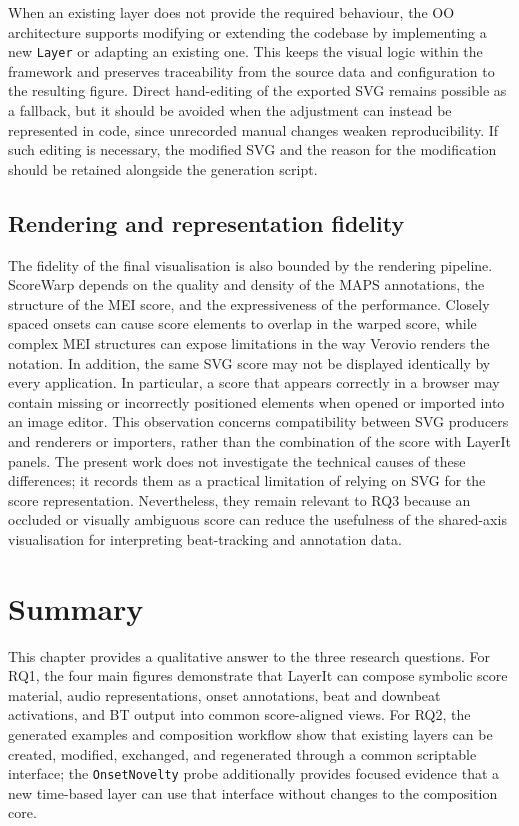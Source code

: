 When an existing layer does not provide the required behaviour, the OO architecture supports modifying or extending the codebase by implementing a new \texttt{Layer} or adapting an existing one. This keeps the visual logic within the framework and preserves traceability from the source data and configuration to the resulting figure. Direct hand-editing of the exported SVG remains possible as a fallback, but it should be avoided when the adjustment can instead be represented in code, since unrecorded manual changes weaken reproducibility. If such editing is necessary, the modified SVG and the reason for the modification should be retained alongside the generation script.

\subsection{Rendering and representation fidelity}

The fidelity of the final visualisation is also bounded by the rendering pipeline. ScoreWarp depends on the quality and density of the MAPS annotations, the structure of the MEI score, and the expressiveness of the performance. Closely spaced onsets can cause score elements to overlap in the warped score, while complex MEI structures can expose limitations in the way Verovio renders the notation. In addition, the same SVG score may not be displayed identically by every application. In particular, a score that appears correctly in a browser may contain missing or incorrectly positioned elements when opened or imported into an image editor. This observation concerns compatibility between SVG producers and renderers or importers, rather than the combination of the score with LayerIt panels. The present work does not investigate the technical causes of these differences; it records them as a practical limitation of relying on SVG for the score representation. Nevertheless, they remain relevant to RQ3 because an occluded or visually ambiguous score can reduce the usefulness of the shared-axis visualisation for interpreting beat-tracking and annotation data.

\section{Summary}

This chapter provides a qualitative answer to the three research questions. For RQ1, the four main figures demonstrate that LayerIt can compose symbolic score material, audio representations, onset annotations, beat and downbeat activations, and BT output into common score-aligned views. For RQ2, the generated examples and composition workflow show that existing layers can be created, modified, exchanged, and regenerated through a common scriptable interface; the \texttt{OnsetNovelty} probe additionally provides focused evidence that a new time-based layer can use that interface without changes to the composition core.

